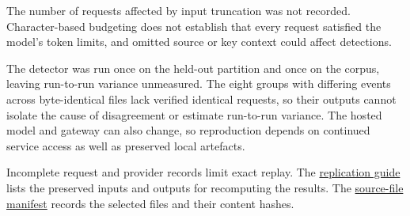 The number of requests affected by input truncation was not recorded. Character-based budgeting does not establish that every request satisfied the model's token limits, and omitted source or key context could affect detections.

The detector was run once on the held-out partition and once on the corpus, leaving run-to-run variance unmeasured. The eight groups with differing events across byte-identical files lack verified identical requests, so their outputs cannot isolate the cause of disagreement or estimate run-to-run variance. The hosted model and gateway can also change, so reproduction depends on continued service access as well as preserved local artefacts.

Incomplete request and provider records limit exact replay. The \href{https://github.com/kristoisberg/thesis-paper/blob/80a9898da632ee43e81cc9404365f9f5f21c3bb1/analysis/README.md\#frozen-snapshots-and-preserved-outputs}{replication guide} lists the preserved inputs and outputs for recomputing the results. The \href{https://github.com/kristoisberg/thesis-paper/blob/bb3bf6056cc7bbda29bb0fb5f0b720e7f9d06028/analysis/corpus_source_manifest.csv}{source-file manifest} records the selected files and their content hashes.
